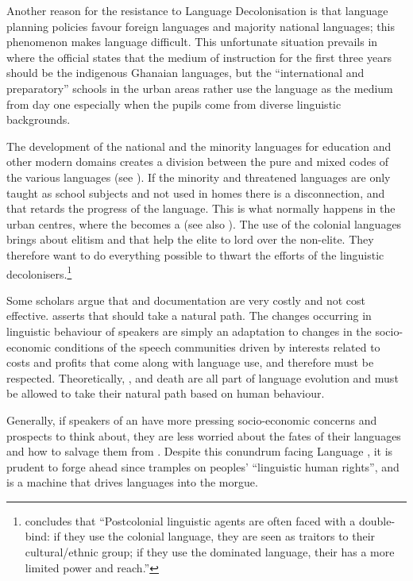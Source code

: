 \documentclass[output=paper,
modfonts
]{langscibook}
\begin{document}
Another reason for the resistance to Language Decolonisation is that language planning policies favour foreign languages and majority national languages; this phenom\-e\-non makes language  difficult. This unfortunate situation prevails in   where the official  states that the medium of instruction for the first three years should be the indigenous Ghanaian languages, but the “international and preparatory” schools in the urban areas rather use the  language as the medium from day one especially when the pupils come from diverse linguistic backgrounds.

The development of the national and the minority languages for education and other modern domains creates a division between the pure and mixed codes of the various languages (see \citealt[534]{Jaffe2009}). If the minority and threatened languages are only taught as school subjects and not used in homes there is a disconnection, and that retards the progress of the language. This is what normally happens in the urban centres, where the  becomes a  (see also \citealt[14--15]{Fishman2001}). The use of the colonial languages brings about elitism and  that help the elite to lord over the non-elite. They therefore want to do everything possible to thwart the efforts of the linguistic decolonisers.\footnote{\citet[535]{Jaffe2009} concludes that “Postcolonial linguistic agents are often faced with a double-bind: if they use the colonial language, they are seen as traitors to their cultural/ethnic group; if they use the dominated language, their  has a more limited power and reach.” }

Some scholars argue that  and documentation are very costly and not cost effective. \citet[162, 191]{Mufwene2002} asserts that  should take a natural path. The changes occurring in linguistic behaviour of speakers are simply an adaptation to changes in the socio-economic conditions of the speech communities driven by interests related to costs and profits that come along with language use, and therefore must be respected. Theoretically, ,  and death are all part of language evolution and must be allowed to take their natural path based on human behaviour. 

Generally, if speakers of an  have more pressing socio-economic concerns and prospects to think about, they are less worried about the fates of their languages and how to salvage them from . Despite this conundrum facing Language , it is prudent to forge ahead since  tramples on peoples’ “linguistic human rights”, and  is a machine that drives languages into the morgue.
\end{document}
